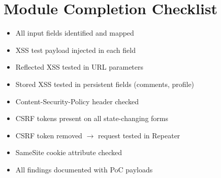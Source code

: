 \section{Module Completion Checklist}

\begin{tcolorbox}[findingstyle, title={Level 06 Burp Checklist}]
\begin{itemize}
  \item[\checkbox] All input fields identified and mapped
  \item[\checkbox] XSS test payload injected in each field
  \item[\checkbox] Reflected XSS tested in URL parameters
  \item[\checkbox] Stored XSS tested in persistent fields (comments, profile)
  \item[\checkbox] Content-Security-Policy header checked
  \item[\checkbox] CSRF tokens present on all state-changing forms
  \item[\checkbox] CSRF token removed $\to$ request tested in Repeater
  \item[\checkbox] SameSite cookie attribute checked
  \item[\checkbox] All findings documented with PoC payloads
\end{itemize}
\end{tcolorbox}
